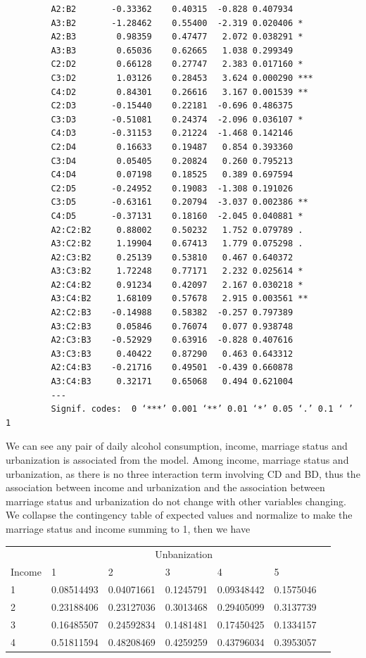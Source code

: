 \documentclass{article}
\begin{document}
\begin{verbatim}
         A2:B2       -0.33362    0.40315  -0.828 0.407934    
         A3:B2       -1.28462    0.55400  -2.319 0.020406 *  
         A2:B3        0.98359    0.47477   2.072 0.038291 *  
         A3:B3        0.65036    0.62665   1.038 0.299349    
         C2:D2        0.66128    0.27747   2.383 0.017160 *  
         C3:D2        1.03126    0.28453   3.624 0.000290 ***
         C4:D2        0.84301    0.26616   3.167 0.001539 ** 
         C2:D3       -0.15440    0.22181  -0.696 0.486375    
         C3:D3       -0.51081    0.24374  -2.096 0.036107 *  
         C4:D3       -0.31153    0.21224  -1.468 0.142146    
         C2:D4        0.16633    0.19487   0.854 0.393360    
         C3:D4        0.05405    0.20824   0.260 0.795213    
         C4:D4        0.07198    0.18525   0.389 0.697594    
         C2:D5       -0.24952    0.19083  -1.308 0.191026    
         C3:D5       -0.63161    0.20794  -3.037 0.002386 ** 
         C4:D5       -0.37131    0.18160  -2.045 0.040881 *  
         A2:C2:B2     0.88002    0.50232   1.752 0.079789 .  
         A3:C2:B2     1.19904    0.67413   1.779 0.075298 .  
         A2:C3:B2     0.25139    0.53810   0.467 0.640372    
         A3:C3:B2     1.72248    0.77171   2.232 0.025614 *  
         A2:C4:B2     0.91234    0.42097   2.167 0.030218 *  
         A3:C4:B2     1.68109    0.57678   2.915 0.003561 ** 
         A2:C2:B3    -0.14988    0.58382  -0.257 0.797389    
         A3:C2:B3     0.05846    0.76074   0.077 0.938748    
         A2:C3:B3    -0.52929    0.63916  -0.828 0.407616    
         A3:C3:B3     0.40422    0.87290   0.463 0.643312    
         A2:C4:B3    -0.21716    0.49501  -0.439 0.660878    
         A3:C4:B3     0.32171    0.65068   0.494 0.621004    
         ---
         Signif. codes:  0 ‘***’ 0.001 ‘**’ 0.01 ‘*’ 0.05 ‘.’ 0.1 ‘ ’ 1
    \end{verbatim}
    We can see any pair of daily alcohol consumption, income, marriage status and urbanization is associated from the model. Among income, marriage status and urbanization, as there is no three interaction term involving CD and BD, thus the association between income and urbanization and the association between marriage status and urbanization do not change with other variables changing. We collapse the contingency table of expected values and normalize to make the marriage status and income summing to 1, then we have
    \begin{center}
    	\begin{tabular}{lllllll}
    	\toprule
    	& \multicolumn{5}{c}{Unbanization}\\
Income &     1        &  2       &  3       &   4         &5\\
\midrule
1      & 0.08514493& 0.04071661 &0.1245791 &0.09348442 &0.1575046\\
2      & 0.23188406& 0.23127036 &0.3013468 &0.29405099 &0.3137739\\
3      & 0.16485507& 0.24592834 &0.1481481 &0.17450425 &0.1334157\\
4      & 0.51811594& 0.48208469 &0.4259259 &0.43796034 &0.3953057\\
    	\bottomrule
    	\end{tabular}
    \end{center}
\end{document}
